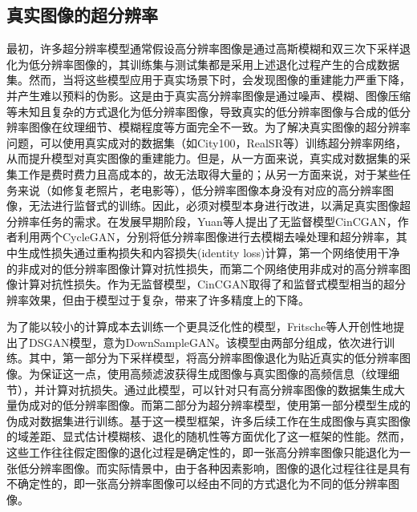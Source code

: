 \subsection{真实图像的超分辨率}
最初，许多超分辨率模型通常假设高分辨率图像是通过高斯模糊和双三次下采样退化为低分辨率图像的，其训练集与测试集都是采用上述退化过程产生的合成数据集。然而，当将这些模型应用于真实场景下时，会发现图像的重建能力严重下降，并产生难以预料的伪影。这是由于真实高分辨率图像是通过噪声、模糊、图像压缩等未知且复杂的方式退化为低分辨率图像，导致真实的低分辨率图像与合成的低分辨率图像在纹理细节、模糊程度等方面完全不一致。为了解决真实图像的超分辨率问题，可以使用真实成对的数据集（如City100，RealSR等）训练超分辨率网络，从而提升模型对真实图像的重建能力。但是，从一方面来说，真实成对数据集的采集工作是费时费力且高成本的，故无法取得大量的；从另一方面来说，对于某些任务来说（如修复老照片，老电影等），低分辨率图像本身没有对应的高分辨率图像，无法进行监督式的训练。因此，必须对模型本身进行改进，以满足真实图像超分辨率任务的需求。在发展早期阶段，Yuan等人提出了无监督模型CinCGAN，作者利用两个CycleGAN，分别将低分辨率图像进行去模糊去噪处理和超分辨率，其中生成性损失通过重构损失和内容损失(identity loss)计算，第一个网络使用干净的非成对的低分辨率图像计算对抗性损失，而第二个网络使用非成对的高分辨率图像计算对抗性损失。作为无监督模型，CinCGAN取得了和监督式模型相当的超分辨率效果，但由于模型过于复杂，带来了许多精度上的下降。

为了能以较小的计算成本去训练一个更具泛化性的模型，Fritsche等人开创性地提出了DSGAN模型，意为DownSampleGAN。该模型由两部分组成，依次进行训练。其中，第一部分为下采样模型，将高分辨率图像退化为贴近真实的低分辨率图像。为保证这一点，使用高频滤波获得生成图像与真实图像的高频信息（纹理细节），并计算对抗损失。通过此模型，可以针对只有高分辨率图像的数据集生成大量伪成对的低分辨率图像。而第二部分为超分辨率模型，使用第一部分模型生成的伪成对数据集进行训练。基于这一模型框架，许多后续工作在生成图像与真实图像的域差距、显式估计模糊核、退化的随机性等方面优化了这一框架的性能。然而，这些工作往往假定图像的退化过程是确定性的，即一张高分辨率图像只能退化为一张低分辨率图像。而实际情景中，由于各种因素影响，图像的退化过程往往是具有不确定性的，即一张高分辨率图像可以经由不同的方式退化为不同的低分辨率图像。

